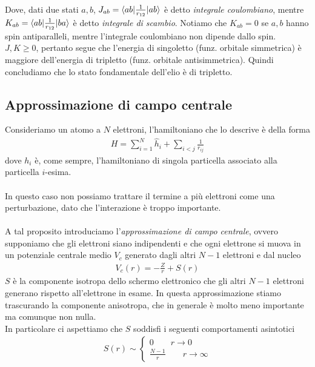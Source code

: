 \documentclass{article}
\begin{document}
Dove, dati due stati $a, b$, $J_{ab} = \braket{ab|\frac{1}{r_{12}}|ab}$ è detto \textit{integrale coulombiano}, mentre $K_{ab} = \braket{ab|\frac{1}{r_{12}}|ba}$ è detto \textit{integrale di scambio}. Notiamo che $K_{ab} = 0$ se $a, b$ hanno spin antiparalleli, mentre l'integrale coulombiano non dipende dallo spin. \\
$J, K \geq 0$, pertanto segue che l'energia di singoletto (funz. orbitale simmetrica) è maggiore dell'energia di tripletto (funz. orbitale antisimmetrica). Quindi concludiamo che lo stato fondamentale dell'elio è di tripletto.

\newpage
\subsection{Approssimazione di campo centrale}
Consideriamo un atomo a $N$ elettroni, l'hamiltoniano che lo descrive è della forma 
\begin{align}
    H = \sum_{i = 1}^N \hat{h}_i + \sum_{i < j}\frac{1}{r_{ij}} \tag{2.4.1}
\end{align}
dove $h_i$ è, come sempre, l'hamiltoniano di singola particella associato alla particella $i$-esima. \\ \\
In questo caso non possiamo trattare il termine a più elettroni come una perturbazione, dato che l'interazione è troppo importante. \\ \\
A tal proposito introduciamo l'\textit{approssimazione di campo centrale}, ovvero supponiamo che gli elettroni siano indipendenti e che ogni elettrone si muova in un potenziale centrale medio $V_c$ generato dagli altri $N - 1$ elettroni e dal nucleo
\begin{align}
    V_c(r) = -\frac{Z}{r} + S(r) \tag{2.4.2}
\end{align}
$S$ è la componente isotropa dello schermo elettronico che gli altri $N - 1$ elettroni generano rispetto all'elettrone in esame. In questa approssimazione stiamo trascurando la componente anisotropa, che in generale è molto meno importante ma comunque non nulla. \\
In particolare ci aspettiamo che $S$ soddisfi i seguenti comportamenti asintotici 
\begin{align}
    S(r) \sim \begin{cases}
        0 \qquad r \rightarrow 0 \\
        \frac{N - 1}{r} \qquad r \rightarrow \infty
    \end{cases} \tag{2.4.3}
\end{align}
\end{document}
